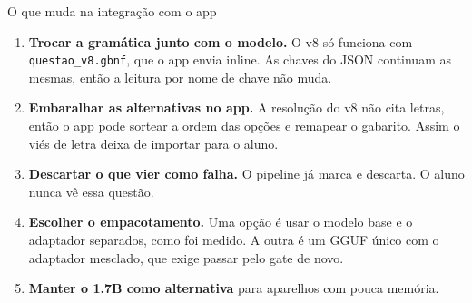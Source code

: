 \documentclass[aspectratio=169,11pt]{beamer}
\begin{document}
\begin{frame}{O que muda na integração com o app}
  \small
  \begin{enumerate}
    \item \textbf{Trocar a gramática junto com o modelo.} O v8 só funciona com \texttt{questao\_v8.gbnf}, que o app envia inline.
          As chaves do JSON continuam as mesmas, então a leitura por nome de chave não muda.
    \item \textbf{Embaralhar as alternativas no app.} A resolução do v8 não cita letras, então o app pode sortear a
          ordem das opções e remapear o gabarito. Assim o viés de letra deixa de importar para o aluno.
    \item \textbf{Descartar o que vier como falha.} O pipeline já marca e descarta. O aluno nunca vê essa questão.
    \item \textbf{Escolher o empacotamento.} Uma opção é usar o modelo base e o adaptador separados, como foi medido. A outra é um GGUF único
          com o adaptador mesclado, que exige passar pelo gate de novo.
    \item \textbf{Manter o 1.7B como alternativa} para aparelhos com pouca memória.
  \end{enumerate}
\end{frame}

\end{document}
